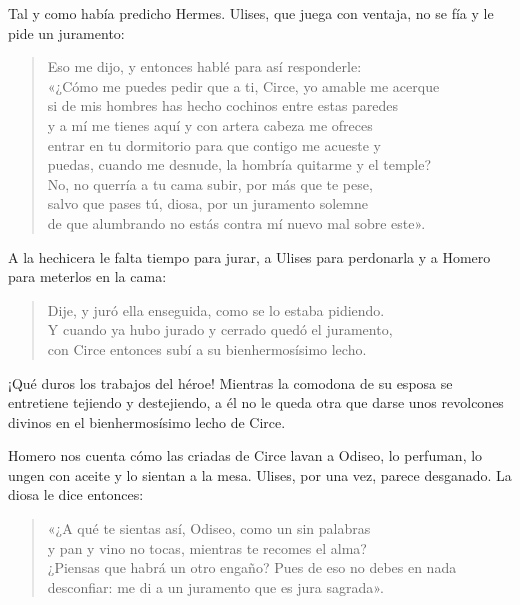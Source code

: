 \documentclass[11pt,a4paper]{article}
\begin{document}
Tal y como había predicho Hermes. Ulises, que juega con ventaja, no se fía y le pide un juramento:

\begin{verse}
Eso me dijo, y entonces hablé para así responderle:\\
«¿Cómo me puedes pedir que a ti, Circe, yo amable me acerque\\
si de mis hombres has hecho cochinos entre estas paredes\\
y a mí me tienes aquí y con artera cabeza me ofreces\\
entrar en tu dormitorio para que contigo me acueste y\\
puedas, cuando me desnude, la hombría quitarme y el temple?\\
No, no querría a tu cama subir, por más que te pese,\\
salvo que pases tú, diosa, por un juramento solemne\\
de que alumbrando no estás contra mí nuevo mal sobre este».
\end{verse}

A la hechicera le falta tiempo para jurar, a Ulises para perdonarla y a Homero para meterlos en la cama:

\begin{verse}
Dije, y juró ella enseguida, como se lo estaba pidiendo.\\
Y cuando ya hubo jurado y cerrado quedó el juramento,\\
con Circe entonces subí a su bienhermosísimo lecho.
\end{verse}

¡Qué duros los trabajos del héroe! Mientras la comodona de su esposa se entretiene tejiendo y destejiendo, a él no le queda otra que darse unos revolcones divinos en el bienhermosísimo lecho de Circe.

Homero nos cuenta cómo las criadas de Circe lavan a Odiseo, lo perfuman, lo ungen con aceite y lo sientan a la mesa. Ulises, por una vez, parece desganado. La diosa le dice entonces:

\begin{verse}
«¿A qué te sientas así, Odiseo, como un sin palabras\\
y pan y vino no tocas, mientras te recomes el alma?\\
¿Piensas que habrá un otro engaño? Pues de eso no debes en nada\\
desconfiar: me di a un juramento que es jura sagrada».
\end{verse}
\end{document}
